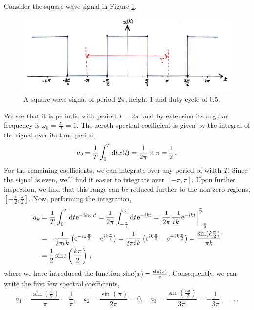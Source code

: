 \begin{exmp}
  Consider the square wave signal in Figure \ref{fig::lecture_4_square_wave}.
  \begin{figure}[H]
    \includegraphics[width=\textwidth]{images/lecture_4_square_wave.JPG}
    \caption{
      A square wave signal of period $2\pi$, height 1 and duty cycle of $0.5$.
    }
    \label{fig::lecture_4_square_wave}
  \end{figure}
  We see that it is periodic with period $T = 2\pi$, and by extension its
  angular frequency is $\omega_0 = \frac{2\pi}{T} = 1$. The zeroth spectral
  coefficient is given by the integral of the signal over its time period,
  \begin{displaymath}
    a_0 = \frac{1}{T}\int_0^T\mathrm{d}t\mkern1mu x(t) = \frac{1}{2\pi}\times\pi = \frac{1}{2} \,.
  \end{displaymath}
  For the remaining coefficients, we can integrate over any period of width $T$.
  Since the signal is even, we'll find it easier to integrate over $[-\pi,\pi]$.
  Upon further inspection, we find that this range can be reduced further to
  the non-zero regions, $[-\frac{\pi}{2},\frac{\pi}{2}]$. Now, performing the
  integration,
  \begin{align*}
    a_k &= \frac{1}{T}\int_0^T\mathrm{d}t\mkern1mu\mathrm{e}^{-{i\mkern1mu} k\omega_0 t}
    = \frac{1}{2\pi}\int_{-\frac{\pi}{2}}^{\frac{\pi}{2}} \mathrm{d}t\mkern1mu\mathrm{e}^{-{i\mkern1mu} kt}
    = \left.\frac{1}{2\pi}\frac{-1}{{i\mkern1mu} k}\mathrm{e}^{-{i\mkern1mu} kt}\right|_{-\frac{\pi}{2}}^{\frac{\pi}{2}} \\
    &= -\frac{1}{2\pi{i\mkern1mu} k}\left(\mathrm{e}^{-{i\mkern1mu} k\frac{\pi}{2}} - \mathrm{e}^{{i\mkern1mu} k\frac{\pi}{2}}\right)
    = \frac{1}{2\pi{i\mkern1mu} k}\left(\mathrm{e}^{{i\mkern1mu} k\frac{\pi}{2}} - \mathrm{e}^{-{i\mkern1mu} k\frac{\pi}{2}}\right)
    = \frac{\sin(k\frac{\pi}{2})}{\pi k} \\
    &= \frac{1}{2}\operatorname{sinc}\left(\frac{k\pi}{2}\right) \,,
  \end{align*}
  where we have introduced the function $\operatorname{sinc}(x) = \frac{\sin(x)}{x}$. Consequently,
  we can write the first few spectral coefficients,
  \begin{displaymath}
    a_1 = \frac{\sin\left(\frac{\pi}{2}\right)}{\pi} = \frac{1}{\pi}, \quad
    a_2 = \frac{\sin(\pi)}{2\pi} = 0, \quad
    a_3 = \frac{\sin\left(\frac{3\pi}{2}\right)}{3\pi} = -\frac{1}{3\pi}, \quad\hdots \,.
  \end{displaymath}
\end{exmp}
